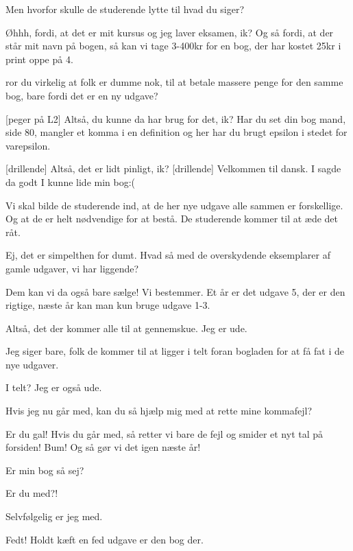 \documentclass[a4paper,11pt]{article}
\begin{document}
\begin{sketch}
 Men hvorfor skulle de studerende lytte til hvad du siger?

 Øhhh, fordi, at det er mit kursus og jeg laver eksamen, ik? 
 Og så fordi, at der står mit navn på bogen, så kan vi tage 3-400kr for en bog, der har kostet 25kr i print oppe på 4. 

 ror du virkelig at folk er dumme nok, til at betale massere penge for den samme bog, bare fordi det er en ny udgave?

[peger på L2] Altså, du kunne da har brug for det, ik? Har du set din bog mand, side 80, mangler et komma i en definition og her har du brugt epsilon i stedet for varepsilon. 

[drillende] Altså, det er lidt pinligt, ik? 
[drillende] Velkommen til dansk.
 I sagde da godt I kunne lide min bog:(

 Vi skal bilde de studerende ind, at de her nye udgave alle sammen er forskellige. Og at de er helt nødvendige for at bestå. De studerende kommer til at æde det råt.

 Ej, det er simpelthen for dumt. Hvad så med de overskydende eksemplarer af gamle udgaver, vi har liggende?

 Dem kan vi da også bare sælge! Vi bestemmer. Et år er det udgave 5, der er den rigtige, næste år kan man kun bruge udgave 1-3. 

 Altså, det der kommer alle til at gennemskue. Jeg er ude.

 Jeg siger bare, folk de kommer til at ligger i telt foran bogladen for at få fat i de nye udgaver. 

 I telt? Jeg er også ude.

 Hvis jeg nu går med, kan du så hjælp mig med at rette mine kommafejl?

 Er du gal! Hvis du går med, så retter vi bare de fejl og smider et nyt tal på forsiden! Bum! Og så gør vi det igen næste år!

 Er min bog så sej?

 Er du med?! 

 Selvfølgelig er jeg med.

 Fedt! 
 Holdt kæft en fed udgave er den bog der.



\end{sketch}
\end{document}
